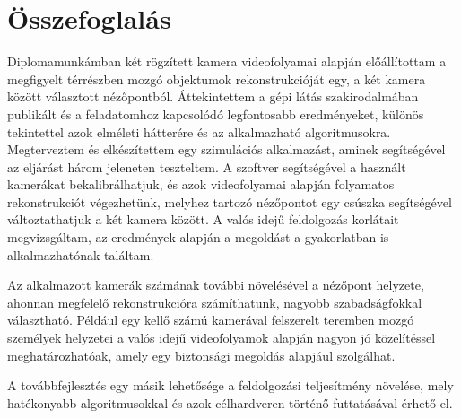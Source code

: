 \chapter{Összefoglalás}

Diplomamunkámban két rögzített kamera videofolyamai alapján előállítottam a megfigyelt térrészben mozgó objektumok rekonstrukcióját egy, a két kamera között választott nézőpontból. Áttekintettem a gépi látás szakirodalmában publikált és a feladatomhoz kapcsolódó legfontosabb eredményeket, különös tekintettel azok elméleti hátterére és az alkalmazható algoritmusokra. Megterveztem és elkészítettem egy szimulációs alkalmazást, aminek segítségével az eljárást három jeleneten teszteltem. A szoftver segítségével a használt kamerákat bekalibrálhatjuk, és azok videofolyamai alapján folyamatos rekonstrukciót végezhetünk, melyhez tartozó nézőpontot egy csúszka segítségével változtathatjuk a két kamera között. A valós idejű feldolgozás korlátait megvizsgáltam, az eredmények alapján a megoldást a gyakorlatban is alkalmazhatónak találtam.

Az alkalmazott kamerák számának további növelésével a nézőpont helyzete, ahonnan megfelelő rekonstrukcióra számíthatunk, nagyobb szabadságfokkal választható. Például egy kellő számú kamerával felszerelt teremben mozgó személyek helyzetei a valós idejű videofolyamok alapján nagyon jó közelítéssel meghatározhatóak, amely egy biztonsági megoldás alapjául szolgálhat.

A továbbfejlesztés egy másik lehetősége a feldolgozási teljesítmény növelése, mely hatékonyabb algoritmusokkal és azok célhardveren történő futtatásával érhető el.
